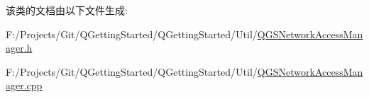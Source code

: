 该类的文档由以下文件生成\+:\begin{DoxyCompactItemize}
\item 
F\+:/\+Projects/\+Git/\+Q\+Getting\+Started/\+Q\+Getting\+Started/\+Util/\mbox{\hyperlink{_q_g_s_network_access_manager_8h}{Q\+G\+S\+Network\+Access\+Manager.\+h}}\item 
F\+:/\+Projects/\+Git/\+Q\+Getting\+Started/\+Q\+Getting\+Started/\+Util/\mbox{\hyperlink{_q_g_s_network_access_manager_8cpp}{Q\+G\+S\+Network\+Access\+Manager.\+cpp}}\end{DoxyCompactItemize}
